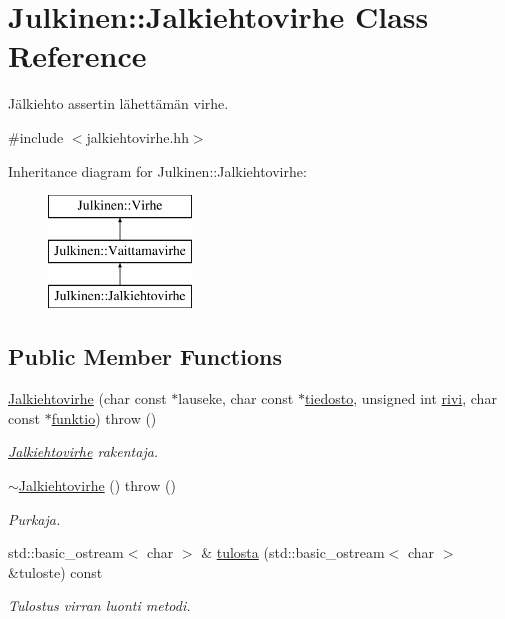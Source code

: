 \hypertarget{class_julkinen_1_1_jalkiehtovirhe}{}\section{Julkinen\+:\+:Jalkiehtovirhe Class Reference}
\label{class_julkinen_1_1_jalkiehtovirhe}


Jälkiehto assertin lähettämän virhe.  




{\ttfamily \#include $<$jalkiehtovirhe.\+hh$>$}

Inheritance diagram for Julkinen\+:\+:Jalkiehtovirhe\+:\begin{figure}[H]
\begin{center}
\leavevmode
\includegraphics[height=3.000000cm]{class_julkinen_1_1_jalkiehtovirhe}
\end{center}
\end{figure}
\subsection*{Public Member Functions}
\begin{DoxyCompactItemize}
\item 
\hyperlink{class_julkinen_1_1_jalkiehtovirhe_a23d92ebad4c84c880bef9ddd48e21efb}{Jalkiehtovirhe} (char const $\ast$lauseke, char const $\ast$\hyperlink{class_julkinen_1_1_vaittamavirhe_a8624cd880b8466188ef6de480431dffb}{tiedosto}, unsigned int \hyperlink{class_julkinen_1_1_vaittamavirhe_abc571141231b3fa789ae41d2d80642ef}{rivi}, char const $\ast$\hyperlink{class_julkinen_1_1_vaittamavirhe_afd5de6b5639336288d28fd077c84a20c}{funktio})  throw ()
\begin{DoxyCompactList}\small\item\em \hyperlink{class_julkinen_1_1_jalkiehtovirhe}{Jalkiehtovirhe} rakentaja. \end{DoxyCompactList}\item 
\hypertarget{class_julkinen_1_1_jalkiehtovirhe_a2ac148c53e973b52e7f9bcc8b3c785d5}{}\hyperlink{class_julkinen_1_1_jalkiehtovirhe_a2ac148c53e973b52e7f9bcc8b3c785d5}{$\sim$\+Jalkiehtovirhe} ()  throw ()\label{class_julkinen_1_1_jalkiehtovirhe_a2ac148c53e973b52e7f9bcc8b3c785d5}

\begin{DoxyCompactList}\small\item\em Purkaja. \end{DoxyCompactList}\item 
std\+::basic\+\_\+ostream$<$ char $>$ \& \hyperlink{class_julkinen_1_1_jalkiehtovirhe_a5cbdae2671dfaa4700a9118048c7570e}{tulosta} (std\+::basic\+\_\+ostream$<$ char $>$ \&tuloste) const 
\begin{DoxyCompactList}\small\item\em Tulostus virran luonti metodi. \end{DoxyCompactList}\end{DoxyCompactItemize}
